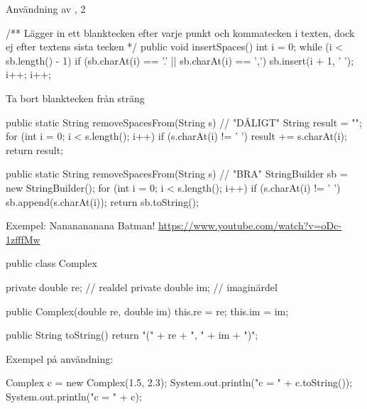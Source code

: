 \documentclass{lecturenotes}
\begin{document}
\begin{Slide}{Användning av , 2}
\begin{Code}
/** Lägger in ett blanktecken efter varje punkt och kommatecken 
    i texten, dock ej efter textens sista tecken */
public void insertSpaces() {
    int i = 0;
    while (i < sb.length() - 1) {
        if (sb.charAt(i) == '.' || sb.charAt(i) == ',') {
            sb.insert(i + 1, ' ');
            i++;
        }
        i++;
    }
}
\end{Code}
\end{Slide} 

\begin{Slide}{Ta bort blanktecken från sträng}

\begin{Code}
public static String removeSpacesFrom(String s) { // "DÅLIGT"
    String result = "";
    for (int i = 0; i < s.length(); i++) {
        if (s.charAt(i) != ' ') {
            result += s.charAt(i);
        }
    }
    return result;
}

public static String removeSpacesFrom(String s) { // "BRA"
    StringBuilder sb = new StringBuilder();
    for (int i = 0; i < s.length(); i++) {
        if (s.charAt(i) != ' ') {
            sb.append(s.charAt(i));
        }
    }
    return sb.toString();
}
\end{Code}
\end{Slide} 

\begin{Slide}{Exempel: Nananananana Batman!}
\url{https://www.youtube.com/watch?v=oDc-1zfffMw}
\end{Slide} 

\begin{Slide}{}

\begin{Code}
public class Complex {
    private double re; // realdel
    private double im; // imaginärdel
    
    public Complex(double re, double im) {
        this.re = re;
        this.im = im;
    }
    
    public String toString() {
        return "(" + re + ", " + im + ")";
    }
}
\end{Code}


Exempel på användning:

\begin{Code}
Complex c = new Complex(1.5, 2.3);
System.out.println("c = " + c.toString());
System.out.println("c = " + c);
\end{Code}
\end{Slide} 
\end{document}
